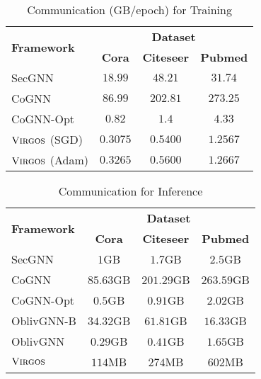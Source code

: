 \begin{table}[!t]
 	\centering
 	\caption{Communication (GB/epoch) for Training}
 	\label{table:comm_on_off_gcn}
 \setlength\tabcolsep{9pt}
 	\begin{tabular}{l|ccc}
 	\hline
 	\multirow{2}{*}{\textbf{Framework}} & \multicolumn{3}{c}{\textbf{Dataset}}
	\\\cline{2-4}
 & \textbf{Cora} 	 & \textbf{Citeseer} & \textbf{Pubmed}\\\hline
 	SecGNN & 	$18.99$ & $48.21$ & $31.74$\\
    CoGNN & $86.99$ & $202.81$ &$273.25$ \\
    CoGNN-Opt & $0.82$ & $1.4$ & $4.33$\\\hline
 \rowcolor{grayL}$\textnormal{\textsc{Virgos}}$ (SGD) & $0.3075$ & $0.5400$ & $1.2567$ \\
 \rowcolor{grayL}$\textnormal{\textsc{Virgos}}$ (Adam) & $0.3265$ & $0.5600$ & $1.2667$ \\
 	 	\hline
 	 	\end{tabular}
 	\end{table}


\begin{table}[!t]
 	\centering
 	\caption{Communication for Inference}
 	\label{table:comm_on_off_inf}
\setlength\tabcolsep{11pt}
 	\begin{tabular}{l|ccc}
 	\hline
 	\multirow{2}{*}{\textbf{Framework}} & \multicolumn{3}{c}{\textbf{Dataset}}
	\\\cline{2-4}
 & \textbf{Cora} 	 & \textbf{Citeseer} & \textbf{Pubmed}\\\hline
	SecGNN & 	$1$GB & $1.7$GB & $2.5$GB\\
    CoGNN & $85.63$GB & $201.29$GB &$263.59$GB\\
 CoGNN-Opt & $0.5$GB &$0.91$GB & $2.02$GB\\\hline
 OblivGNN-B & $34.32$GB & $61.81$GB &$16.33$GB\\
 OblivGNN &$0.29$GB&$0.41$GB& $1.65$GB\\\hline
    \rowcolor{grayL}$\textnormal{\textsc{Virgos}}$ & $114$MB & $274$MB & $602$MB \\
 	 	\hline
 	 	\end{tabular}
\end{table}

 \iffalse
 	\begin{figure}[!t]
 	\centering
 	\texttt{[image: ./fig\_and\_tab/fig\_acc]}
 	\caption{Model Accuracy}
 	\label{fig_acc}
\end{figure}
\fi

